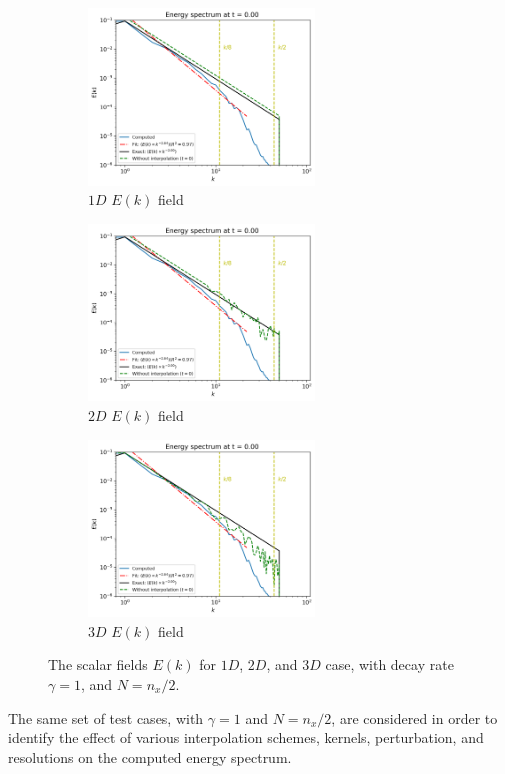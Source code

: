 \begin{figure}[H]
    \begin{subfigure}{7cm}
      \centering\includegraphics[width=6cm]{Code-Figures/sine-vel-prof-1d/ek_00000_loglog.png}
      \caption{$1D$ $E(k)$ field}
    \end{subfigure}
    \begin{subfigure}{7cm}
      \centering\includegraphics[width=6cm]{Code-Figures/sine-vel-prof-2d/ek_00000_loglog.png}
      \caption{$2D$ $E(k)$ field}
    \end{subfigure}
    \begin{subfigure}{7cm}
        \centering\includegraphics[width=6cm]{Code-Figures/sine-vel-prof-3d/ek_00000_loglog.png}
        \caption{$3D$ $E(k)$ field}
      \end{subfigure}
    \caption{The scalar fields $E(k)$ for $1D$, $2D$, and $3D$ case, with decay rate $\gamma=1$, and $N=n_x/2$.}
    \label{fig:espec-scalar-fields-gamma1}
\end{figure}

The same set of test cases, with $\gamma=1$ and $N=n_x/2$, are considered in order to identify the effect of various interpolation schemes, kernels, perturbation, and resolutions on the computed energy spectrum.

